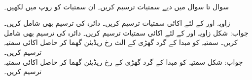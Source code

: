 \\
سوال  تا سوال  میں دیے سمتیات ترسیم کریں۔ ان سمتیات کو  روپ میں لکھیں۔

زاویہ  اور  کے لئے اکائی سمتیات  ترسیم کریں۔ دائرہ  کی ترسیم بھی شامل کریں۔\\
جواب:\quad
شکل 
زاویہ  اور  کے لئے اکائی سمتیات  ترسیم کریں۔ دائرہ  کی ترسیم بھی شامل کریں۔
سمتیہ  کو مبدا کے گرد گھڑی کے الٹ رخ  ریڈیئن  گھما کر حاصل اکائی سمتیہ ترسیم کریں۔\\
جواب:\quad
شکل 
سمتیہ  کو مبدا کے گرد گھڑی کے رخ  ریڈیئن  گھما کر حاصل اکائی سمتیہ ترسیم کریں۔
